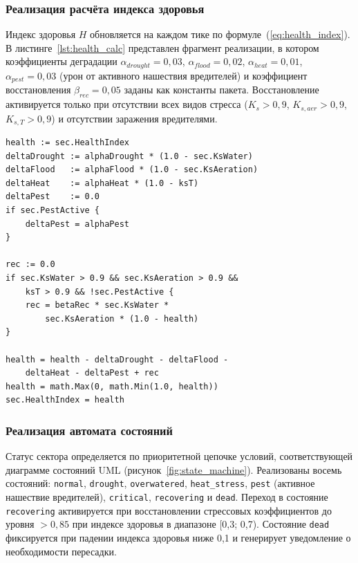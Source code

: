 \subsubsection{Реализация расчёта индекса здоровья}

Индекс здоровья $H$ обновляется на каждом тике по
формуле~(\ref{eq:health_index}). В
листинге~\ref{lst:health_calc} представлен фрагмент
реализации, в котором коэффициенты деградации
$\alpha_{drought} = 0{,}03$, $\alpha_{flood} = 0{,}02$,
$\alpha_{heat} = 0{,}01$, $\alpha_{pest} = 0{,}03$ (урон от
активного нашествия вредителей) и коэффициент восстановления
$\beta_{rec} = 0{,}05$ заданы как константы пакета.
Восстановление активируется только при отсутствии всех
видов стресса ($K_s > 0{,}9$, $K_{s,aer} > 0{,}9$,
$K_{s,T} > 0{,}9$) и отсутствии заражения вредителями.

\begin{lstlisting}[caption={Расчёт индекса здоровья (engine.go)}, label={lst:health_calc}]
health := sec.HealthIndex
deltaDrought := alphaDrought * (1.0 - sec.KsWater)
deltaFlood   := alphaFlood * (1.0 - sec.KsAeration)
deltaHeat    := alphaHeat * (1.0 - ksT)
deltaPest    := 0.0
if sec.PestActive {
    deltaPest = alphaPest
}

rec := 0.0
if sec.KsWater > 0.9 && sec.KsAeration > 0.9 &&
    ksT > 0.9 && !sec.PestActive {
    rec = betaRec * sec.KsWater *
        sec.KsAeration * (1.0 - health)
}

health = health - deltaDrought - deltaFlood -
    deltaHeat - deltaPest + rec
health = math.Max(0, math.Min(1.0, health))
sec.HealthIndex = health
\end{lstlisting}

\subsubsection{Реализация автомата состояний}

Статус сектора определяется по приоритетной цепочке
условий, соответствующей диаграмме состояний UML
(рисунок~\ref{fig:state_machine}). Реализованы восемь
состояний: \texttt{normal}, \texttt{drought},
\texttt{overwatered}, \texttt{heat\_stress},
\texttt{pest} (активное нашествие вредителей),
\texttt{critical}, \texttt{recovering} и \texttt{dead}.
Переход в состояние \texttt{recovering} активируется
при восстановлении стрессовых коэффициентов до уровня
$> 0{,}85$ при индексе здоровья в диапазоне [0{,}3; 0{,}7).
Состояние \texttt{dead} фиксируется при падении индекса
здоровья ниже 0{,}1 и генерирует уведомление о необходимости
пересадки.


